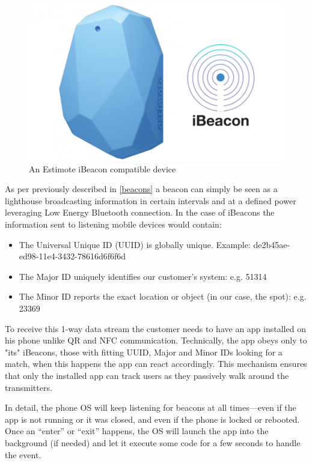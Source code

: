 \vspace{0.5cm}
\begin{figure}[H]
  \centering
    \includegraphics[width=16cm]{images/ibeacon.png}
  \caption{An Estimote iBeacon compatible device}
  \label{fig:estimote-beacon}
\end{figure}
\vspace{0.5cm}

As per previously described in \ref{beacons} a beacon can simply be seen as a lighthouse broadcasting information in certain intervals and at a defined power leveraging Low Energy Bluetooth connection. In the case of iBeacons the information sent to listening mobile devices would contain:


\begin{itemize}
  \item The Universal Unique ID (UUID) is globally unique. Example: de2b45ae-ed98-11e4-3432-78616d6f6f6d
  \item The Major ID uniquely identifies our customer’s system: e.g. 51314
  \item The Minor ID reports the exact location or object (in our case, the spot): e.g. 23369
\end{itemize}

To receive this 1-way data stream the customer needs to have an app installed on his phone unlike QR and NFC communication. Technically, the app obeys only to "its" iBeacons, those with fitting UUID, Major and Minor IDs looking for a match, when this happens the app can react accordingly. This mechanism ensures that only the installed app can track users as they passively walk around the transmitters. 

In detail, the phone OS will keep listening for beacons at all times—even if the app is not running or it was closed, and even if the phone is locked or rebooted. Once an “enter” or “exit” happens, the OS will launch the app into the background (if needed) and let it execute some code for a few seconds to handle the event.

